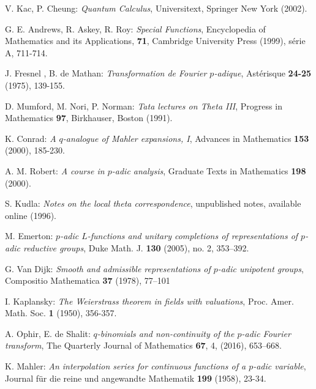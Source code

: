 
\begin{thebibliography}{99}

V. Kac, P. Cheung: {\em Quantum Calculus}, Universitext, Springer New York (2002).

G. E. Andrews, R. Askey, R. Roy: {\em Special Functions}, Encyclopedia of Mathematics and its Applications, \textbf{71}, Cambridge University Press (1999), série A, 711-714.

J. Fresnel , B. de Mathan: {\em Transformation de Fourier $p$-adique}, Astérisque \textbf{24-25} (1975), 139-155.

 D. Mumford, M. Nori, P. Norman: {\em Tata lectures on Theta III}, Progress in Mathematics \textbf{97}, Birkhauser, Boston (1991).
 
 K. Conrad: {\em A $q$-analogue of Mahler expansions, I}, Advances in Mathematics \textbf{153} (2000), 185-230.
 
 A. M. Robert: {\em A course in $p$-adic analysis}, Graduate Texts in Mathematics \textbf{198} (2000).
 
 S. Kudla: {\em Notes on the local theta correspondence}, unpublished notes, available online (1996).
 
 M. Emerton: {\em $p$-adic $L$-functions and unitary completions of representations of $p$-adic reductive groups}, Duke Math. J. \textbf{130} (2005), no. 2, 353–392.
 
 G. Van Dijk: {\em Smooth and admissible representations of $p$-adic unipotent groups}, Compositio Mathematica \textbf{37} (1978), 77--101
 
 I. Kaplansky: {\em The Weierstrass theorem in fields with valuations}, Proc. Amer. Math. Soc. \textbf{1} (1950), 356-357.
 
 A. Ophir, E. de Shalit: {\em $q$-binomials and non-continuity of the $p$-adic Fourier transform}, The Quarterly Journal of Mathematics \textbf{67}, 4, (2016), 653–668.
 
 K. Mahler: {\em An interpolation series for continuous functions of a $p$-adic variable}, Journal für die reine und angewandte Mathematik \textbf{199} (1958), 23-34.

\end{thebibliography}